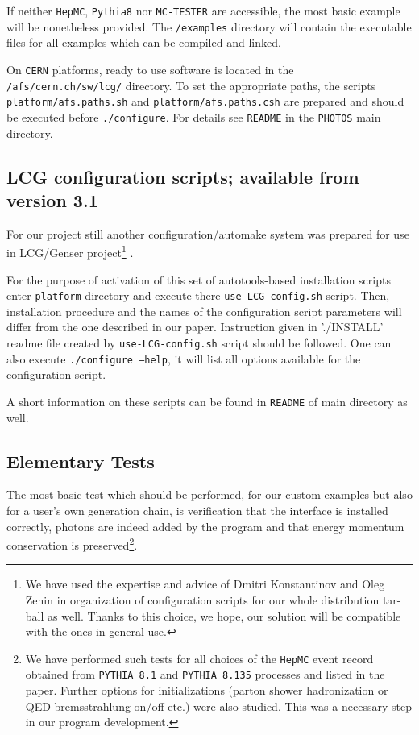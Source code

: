 \documentclass[]{Photos_interface_design}
\begin{document}
If neither {\tt HepMC}, {\tt Pythia8} nor {\tt MC-TESTER} are accessible,  the most basic
 example will be nonetheless provided. The {\tt /examples} directory will 
contain the executable files for all examples which can be compiled and 
linked.

On {\tt CERN} platforms, ready to use software is located in the {\tt /afs/cern.ch/sw/lcg/}
directory. To set the appropriate paths, the scripts 
{\tt platform/afs.paths.sh} and {\tt platform/afs.paths.csh} are prepared and should be executed before
{\tt ./configure}. For details see {\tt README} in the {\tt PHOTOS} main directory.

\subsection{ LCG configuration scripts; available from version 3.1  }
\label{sec:autotools}

For our project still another configuration/automake system was
prepared for use in LCG/Genser project\footnote{We have used the expertise and advice
of Dmitri Konstantinov and Oleg Zenin in organization of configuration scripts
for our whole distribution tar-ball as well. Thanks to this choice, we hope, our solution
 will be compatible with the ones in general use.} \cite{LCG,Kirsanov:2008zz}.

For the purpose of activation of this set of autotools\cite{autotools}-based installation scripts
enter {\tt platform} directory and execute there {\tt use-LCG-config.sh} script.
Then, installation procedure and the names of the configuration script parameters will differ from the one 
described in our paper. Instruction given in  './INSTALL' readme file created by {\tt use-LCG-config.sh} script
should be followed. One can also execute {\tt ./configure --help}, it will 
list all options available for the configuration script.

A short information on these scripts can be found in {\tt README} of main directory as well.

\subsection{Elementary Tests}
\label{sect:elem}

The most basic test which should be performed, for our custom examples but also for a user's own generation chain, 
 is verification that the interface is installed correctly, 
photons are indeed added by the program and that energy momentum 
conservation is preserved\footnote{
We have  performed such  tests for all choices of the {\tt HepMC} event record obtained 
from  {\tt PYTHIA 8.1} and {\tt PYTHIA 8.135} processes and 
listed in the paper. Further  options for initializations 
(parton shower hadronization or QED bremsstrahlung on/off etc.) were also studied.
This was a necessary step in our program development.}.
\end{document}
